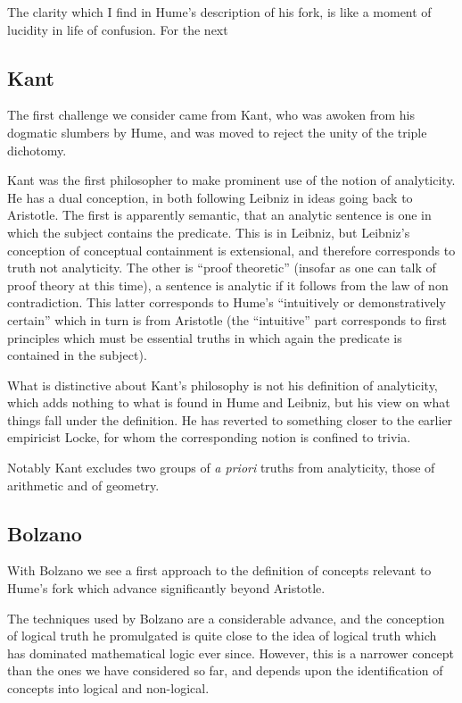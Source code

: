 The clarity which I find in Hume's description of his fork, is like a moment of lucidity in life of confusion.
For the next


\subsection{Kant}

The first challenge we consider came from Kant, who was awoken from
his dogmatic slumbers by Hume, and was moved to reject the unity of
the triple dichotomy.

Kant was the first philosopher to make prominent use of the notion of
analyticity.
He has a dual conception, in both following Leibniz in ideas going
back to Aristotle.
The first is apparently semantic, that an analytic sentence is one in which the
subject contains the predicate.
This is in Leibniz, but Leibniz's conception of conceptual containment
is extensional, and therefore corresponds to truth not analyticity.
The other is ``proof theoretic'' (insofar as one can talk of proof
theory at this time), a sentence is analytic if it follows
from the law of non contradiction.
This latter corresponds to Hume's ``intuitively or demonstratively
certain'' which in turn is from Aristotle (the ``intuitive'' part
corresponds to first principles which must be essential truths in
which again the predicate is contained in the subject).

What is distinctive about Kant's philosophy is not his definition of
analyticity, which adds nothing to what is found in Hume and Leibniz,
but his view on what things fall under the definition.
He has reverted to something closer to the earlier empiricist Locke,
for whom the corresponding notion is confined to trivia.

Notably Kant excludes two groups of \emph{a priori} truths from
analyticity, those of arithmetic and of geometry.

\subsection{Bolzano}

With Bolzano we see a first approach to the definition of concepts
relevant to Hume's fork which advance significantly beyond Aristotle.

The techniques used by Bolzano are a considerable advance, and the
conception of logical truth he promulgated is quite close to the idea
of logical truth which has dominated mathematical logic ever since.
However, this is a narrower concept than the ones we have considered
so far, and depends upon the identification of concepts into logical
and non-logical.

